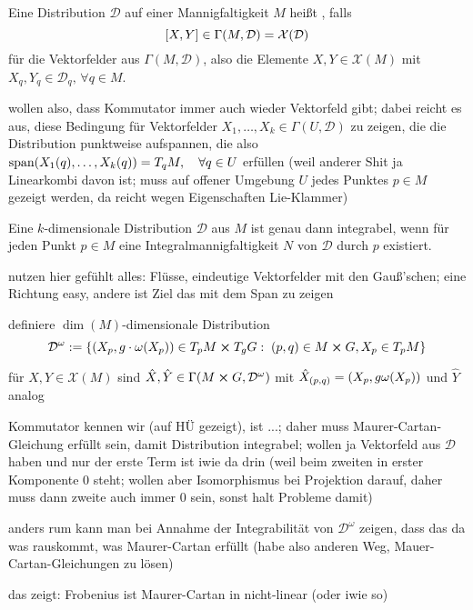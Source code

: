\documentclass[../H_Analysis_main.tex]{subfiles}
\begin{document}
\begin{defi}
Eine Distribution $\mathcal{D}$ auf einer Mannigfaltigkeit $M$ heißt , falls
\begin{equation}
\qty[X, Y] \in \Gamma(M, \mathcal{D}) = \mathcal{X}(\mathcal{D})
\end{equation}
für die Vektorfelder aus $\Gamma(M, \mathcal{D})$, also die Elemente $X, Y \in \mathcal{X}(M)$ mit $X_q, Y_q \in \mathcal{D}_q, \, \forall q \in M$.
\end{defi}
wollen also, dass Kommutator immer auch wieder Vektorfeld gibt; dabei reicht es aus, diese Bedingung für Vektorfelder $X_1, \dots, X_k \in \Gamma(U, \mathcal{D})$ zu zeigen, die die Distribution punktweise aufspannen, die also $\text{span} \qty(X_1(q), \dots, X_k(q)) = T_q M, \quad \forall q \in U$ erfüllen (weil anderer Shit ja Linearkombi davon ist; muss auf offener Umgebung $U$ jedes Punktes $p \in M$ gezeigt werden, da reicht wegen Eigenschaften Lie-Klammer)


\begin{satz}
Eine $k$-dimensionale Distribution $\mathcal{D}$ aus $M$ ist genau dann integrabel, wenn für jeden Punkt $p \in M$ eine Integralmannigfaltigkeit $N$ von $\mathcal{D}$ durch $p$ existiert.
\end{satz}

nutzen hier gefühlt alles: Flüsse, eindeutige Vektorfelder mit den Gauß'schen; eine Richtung easy, andere ist Ziel das mit dem Span zu zeigen


\begin{bsp}
definiere $\dim(M)$-dimensionale Distribution
\begin{equation}
\mathcal{D}^\omega := \qty{\qty(X_p, g \cdot \omega(X_p)) \in T_p M \cross T_g G: \; (p, q) \in M \cross G, X_p \in T_p M}
\end{equation}

für $X, Y \in \mathcal{X}(M)$ sind $\hat{X}, \hat{Y} \in \Gamma(M \cross G, \mathcal{D}^\omega)$ mit $\hat{X}_{(p, q)} = \qty(X_p, g \omega(X_p))$ und $\hat{Y}$ analog

Kommutator kennen wir (auf HÜ gezeigt), ist ...; daher muss Maurer-Cartan-Gleichung erfüllt sein, damit Distribution integrabel; wollen ja Vektorfeld aus $\mathcal{D}$ haben und nur der erste Term ist iwie da drin (weil beim zweiten in erster Komponente 0 steht; wollen aber Isomorphismus bei Projektion darauf, daher muss dann zweite auch immer 0 sein, sonst halt Probleme damit)

anders rum kann man bei Annahme der Integrabilität von $\mathcal{D}^\omega$ zeigen, dass das da was rauskommt, was Maurer-Cartan erfüllt (habe also anderen Weg, Mauer-Cartan-Gleichungen zu lösen)
\end{bsp}
das zeigt: Frobenius ist Maurer-Cartan in nicht-linear (oder iwie so)
\end{document}
